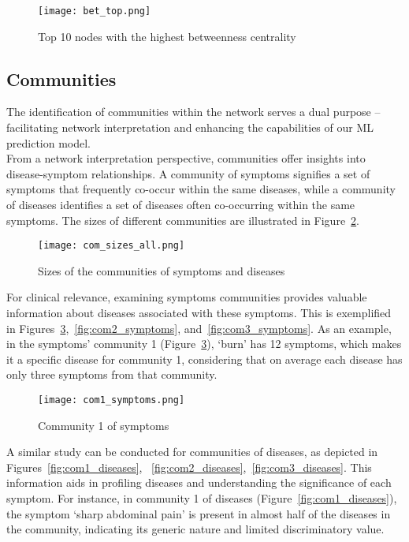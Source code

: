 \begin{figure}[H]
    \centering
    \texttt{[image: bet\_top.png]}
    \caption{Top 10 nodes with the highest betweenness centrality}
    \label{fig:bet_top}
\end{figure}
\noindent

\subsection{Communities}

The identification of communities within the network serves a dual purpose – facilitating network interpretation
and enhancing the capabilities of our ML prediction model.\\
From a network interpretation perspective, communities offer insights into disease-symptom relationships.
A community of symptoms signifies a set of symptoms that frequently co-occur within the same diseases, while a
community of diseases identifies a set of diseases often co-occurring within the same symptoms. The sizes of
different communities are illustrated in Figure~\ref{fig:com_sizes_all}.

\begin{figure}[H]
    \centering
    \texttt{[image: com\_sizes\_all.png]}
    \caption{Sizes of the communities of symptoms and diseases}
    \label{fig:com_sizes_all}
\end{figure}
\noindent

For clinical relevance, examining symptoms communities provides valuable information about diseases associated
with these symptoms. This is exemplified in Figures~\ref{fig:com1_symptoms},~\ref{fig:com2_symptoms},
and~\ref{fig:com3_symptoms}. As an example, in the symptoms' community 1 (Figure~\ref{fig:com1_symptoms}),
`burn' has 12 symptoms, which makes it a specific disease for community 1,
considering that on average each disease has only three symptoms from that community.

\begin{figure}[H]
    \centering
    \texttt{[image: com1\_symptoms.png]}
    \caption{Community 1 of symptoms}
    \label{fig:com1_symptoms}
\end{figure}
\noindent
A similar study can be conducted for communities of diseases, as depicted in Figures~\ref{fig:com1_diseases},
~\ref{fig:com2_diseases},~\ref{fig:com3_diseases}. This information aids in profiling diseases and understanding
the significance of each symptom. For instance, in community 1 of diseases (Figure~\ref{fig:com1_diseases}),
the symptom `sharp abdominal pain' is present in almost half of the diseases in the community, indicating its
generic nature and limited discriminatory value.

